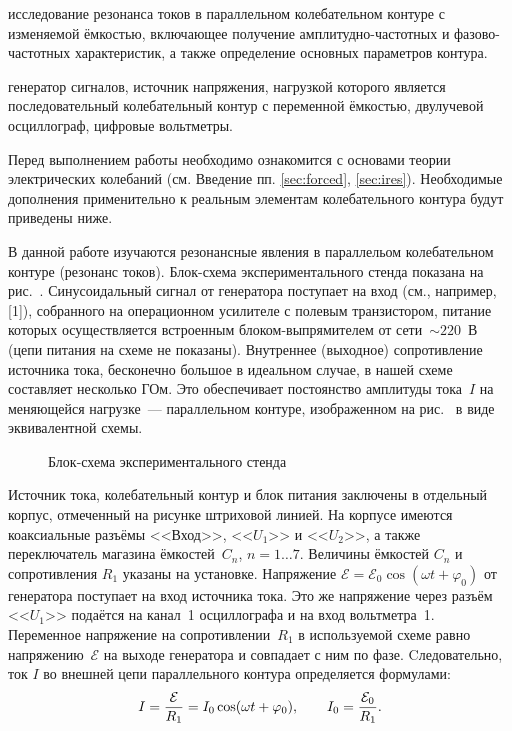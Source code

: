 
\begin{lab:aim}
	исследование резонанса токов в параллельном колебательном контуре с
изменяемой ёмкостью, включающее получение амплитудно-частотных и
фазово-частотных характеристик, а также определение основных параметров контура.
\end{lab:aim}

\begin{lab:equipment}
	генератор сигналов, источник напряжения, нагрузкой которого является
последовательный колебательный контур с переменной ёмкостью, двулучевой
осциллограф, цифровые вольтметры.
\end{lab:equipment}

Перед выполнением работы необходимо ознакомится с основами теории электрических  
колебаний (см. Введение пп. \ref{sec:forced}, \ref{sec:ires}).
Необходимые дополнения применительно к реальным элементам колебательного
контура будут приведены ниже.

\experiment
В данной работе изучаются резонансные явления в параллельом колебательном
контуре (резонанс токов). Блок-схема экспериментального стенда 
показана на рис.~. Синусоидальный сигнал
от генератора поступает на вход  (см., например, [1]), собранного на операционном усилителе с полевым
транзистором, питание которых осуществляется встроенным блоком-выпрямителем от
сети~$\sim220$~В (цепи питания на схеме не показаны).  Внутреннее (выходное)
сопротивление источника тока, бесконечно большое в идеальном случае, в нашей
схеме составляет несколько ГОм. Это обеспечивает постоянство амплитуды тока~$I$
на меняющейся нагрузке~--- параллельном контуре, изображенном на 
рис.~ в виде эквивалентной схемы.

\begin{figure}[h!]
	\caption{Блок-схема экспериментального стенда}
\end{figure}


Источник тока, колебательный контур и блок питания заключены в отдельный корпус,
отмеченный на рисунке штриховой линией. 
На корпусе имеются коаксиальные разъёмы <<Вход>>,
<<${U}_1$>> и <<${U}_2$>>, а также переключатель магазина ёмкостей~$C_n$,
$n=1\ldots7$. Величины ёмкостей $C_n$ и сопротивления $R_1$ указаны на установке.
Напряжение $\mathcal{E}=\mathcal{E}_0\cos(\omega t+\varphi_0)$ от генератора поступает на
вход источника тока. Это же напряжение через разъём <<${U}_1$>> подаётся на
канал~1 осциллографа и на вход вольтметра~1. Переменное напряжение на
сопротивлении~$R_1$ в используемой схеме равно напряжению~$\mathcal{E}$ 
на выходе генератора и совпадает с ним по фазе. 
Cледовательно, ток $I$ во внешней цепи параллельного контура 
определяется формулами:
\begin{equation}\eqmark{2.3.1}
	I=\frac{\mathcal{E}}{R_1}=I_0\cos(\omega t+\varphi_0), \qquad 
    I_0=\frac{\mathcal{E}_0}{R_1}.
\end{equation}

